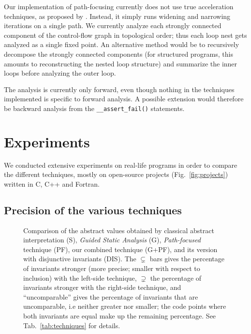 \documentclass{entcs}
\begin{document}
Our implementation of path-focusing currently does not use true acceleration
techniques, as proposed by \citet{Monniaux_Gonnord_SAS11}. Instead, it simply runs widening and narrowing iterations on a single path.
We currently analyze each strongly connected component of the control-flow graph in topological order; thus each loop nest gets analyzed as a single fixed point.
An alternative method would be to recursively decompose the strongly connected components (for structured programs, this amounts to reconstructing the nested loop structure) and summarize the inner loops before analyzing the outer loop.

The analysis is currently only forward, even though nothing in the techniques
implemented is specific to forward analysis. A possible extension would therefore be backward analysis from the \lstinline|__assert_fail()| statements.

\section{Experiments}
\label{sec:experiments}

We conducted extensive experiments on real-life programs in order to compare the
different techniques, mostly on open-source projects (Fig.~\ref{fig:projects}) written in C, C++ and Fortran.

\subsection{Precision of the various techniques}
\label{sec:compare_techniques}

\begin{figure}[h]
  \begin{center}
    
  \end{center} 
  \vspace{-20pt}
  \caption{Comparison of the abstract values obtained by classical abstract
  interpretation (S), \emph{Guided Static
  Analysis} (G), \emph{Path-focused} technique (PF), our combined technique
  (G+PF), and its version with disjunctive invariants (DIS).
  The $\subsetneq$ bars gives the percentage of invariants stronger (more precise; smaller with respect to inclusion) with the left-side technique,
$\supsetneq$ the percentage of invariants stronger with the right-side technique,
and ``uncomparable'' gives the percentage of invariants that are uncomparable, i.e
neither greater nor smaller;
the code points where both invariants are equal make up the remaining percentage. See Tab.~\ref{tab:techniques} for details.}
  \label{fig:techniques}
\end {figure}
\end{document}
